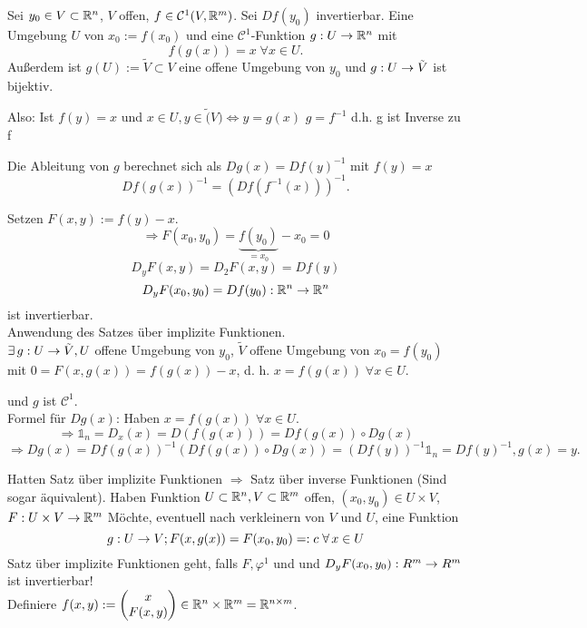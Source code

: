 \documentclass[../ana2.tex]{subfiles}
\begin{document}
\begin{satz}
    Sei \( y_0 \in V \subset \mathbb{R}^n \), \( V \) offen, 
    \( f \in \mathcal{C}^1(V, \mathbb{R}^m) \). Sei \( Df (y_0) \) 
    invertierbar.
    Eine Umgebung \(U\) von \(x_0 := f(x_0) \) und eine \(\mathcal{C}^1\)-Funktion 
    \(g:U\rightarrow \mathbb{R}^n\) mit
    \[ f(g(x)) = x \;\forall x \in U. \]
    Außerdem ist \( g(U) := \tilde{V} \subset V \) eine offene Umgebung
    von \( y_0 \) und 
    \( g:U\rightarrow \tilde{V} \) ist bijektiv.
    \begin{bem}
        Also: Ist \(f(y) = x\) und \(x \in U, y \in \tilde(V) \Leftrightarrow y = g(x)\)
        \(g = f^{-1}\) d.h. g ist Inverse zu f
    \end{bem}
    Die Ableitung von \(g\) berechnet sich als 
    \( Dg(x) = Df(y)^{-1} \) mit \( f(y) = x \)
    \[ Df(g(x))^{-1} = (Df(f^{-1}(x)))^{-1}. \]
\end{satz}
\begin{bew}
    Setzen \( F(x,y) := f(y) - x \).
    \[ \Rightarrow F(x_0, y_0) = \underbrace{f(y_0)}_{=x_0} - x_0 = 0 \]
    \[ D_y F(x,y) = D_2 F(x,y) = Df(y) \]
    \[ D_y F(x_0, y_0) 
    = Df(y_0):\mathbb{R}^n\rightarrow \mathbb{R}^n \]
    ist invertierbar.\\
    Anwendung des Satzes über implizite Funktionen.\\
    \( \exists \abb{g}{U}{\tilde{V}}, U \) offene Umgebung 
    von \(y_0\), \(\tilde{V}\) offene Umgebung von \( x_0 = f(y_0) \)
    mit \(0= F(x, g(x)) = f(g(x))-x\), d. h. \( x = f(g(x)) \;\forall x \in U \).

    und \(g\) ist \(\mathcal{C}^1\).\\
    Formel für \(Dg(x)\): Haben \(x = f(g(x)) \;\forall x\in U\).
    \[ \Rightarrow \mathds{1}_n = D_x(x) = D(f(g(x))) 
    = Df(g(x)) \circ D g(x) \]
    \[ \Rightarrow D g(x) = D f(g(x))^{-1}(Df(g(x)) \circ Dg(x))
    = (Df(y))^{-1} \mathds{1}_n = Df(y)^{-1}, g(x) = y. \]
\end{bew}
Hatten Satz über implizite Funktionen 
\( \Rightarrow \) Satz über inverse Funktionen
(Sind sogar äquivalent).
Haben Funktion \(U \subset \mathbb{R}^n, V \subset \mathbb{R}^m  \) offen, 
\( (x_0, y_0) \in U \times V \), \( F:U \times V\rightarrow \mathbb{R}^m \)
Möchte, eventuell nach verkleinern von \(V\) und \(U\), eine Funktion
\[ \abb{g}{U}{V}; F(x, g(x)) = F(x_0, y_0) =: c \; \forall x \in U \]
Satz über implizite Funktionen geht, falls \(F, \varphi^1\) und
und \(D_y F(x_0, y_0):R^m\rightarrow R^m\) ist invertierbar!\\
Definiere \(f(x,y) := \begin{pmatrix} x \\ F(x,y)
\end{pmatrix} \in \mathbb{R}^n \times \mathbb{R}^m = \mathbb{R}^{n \times m} \).
\end{document}
